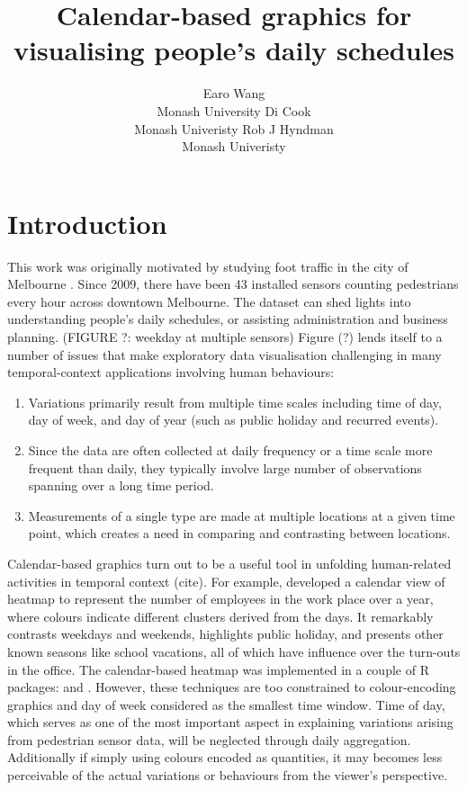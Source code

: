 \documentclass[article]{jss}
\author{
Earo Wang\\Monash University \And Di Cook\\Monash Univeristy \And Rob J Hyndman\\Monash Univeristy
}
\title{Calendar-based graphics for visualising people's daily schedules}
\providecommand{\tightlist}{%
  \setlength{\itemsep}{0pt}\setlength{\parskip}{0pt}}
\begin{document}
\section{Introduction}\label{introduction}

This work was originally motivated by studying foot traffic in the city
of Melbourne \citep{ped}. Since 2009, there have been 43 installed
sensors counting pedestrians every hour across downtown Melbourne. The
dataset can shed lights into understanding people's daily schedules, or
assisting administration and business planning. (FIGURE ?: weekday at
multiple sensors) Figure (?) lends itself to a number of issues that
make exploratory data visualisation challenging in many temporal-context
applications involving human behaviours:

\begin{enumerate}
\def\labelenumi{\arabic{enumi}.}
\tightlist
\item
  Variations primarily result from multiple time scales including time
  of day, day of week, and day of year (such as public holiday and
  recurred events).
\item
  Since the data are often collected at daily frequency or a time scale
  more frequent than daily, they typically involve large number of
  observations spanning over a long time period.
\item
  Measurements of a single type are made at multiple locations at a
  given time point, which creates a need in comparing and contrasting
  between locations.
\end{enumerate}

Calendar-based graphics turn out to be a useful tool in unfolding
human-related activities in temporal context (cite). For example,
\citet{VanWijkCluster1999} developed a calendar view of heatmap to
represent the number of employees in the work place over a year, where
colours indicate different clusters derived from the days. It remarkably
contrasts weekdays and weekends, highlights public holiday, and presents
other known seasons like school vacations, all of which have influence
over the turn-outs in the office. The calendar-based heatmap was
implemented in a couple of R packages: 
\citep{R-ggTimeSeries} and  \citep{R-ggcal}. However, these
techniques are too constrained to colour-encoding graphics and day of
week considered as the smallest time window. Time of day, which serves
as one of the most important aspect in explaining variations arising
from pedestrian sensor data, will be neglected through daily
aggregation. Additionally if simply using colours encoded as quantities,
it may becomes less perceivable of the actual variations or behaviours
from the viewer's perspective.
\end{document}
